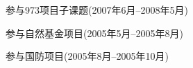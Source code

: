 
\begin{projects}{99}
    \item 参与973项目子课题(2007年6月--2008年5月)
    \item 参与自然基金项目(2005年5月--2005年8月)
    \item 参与国防项目(2005年8月--2005年10月)
\end{projects}
